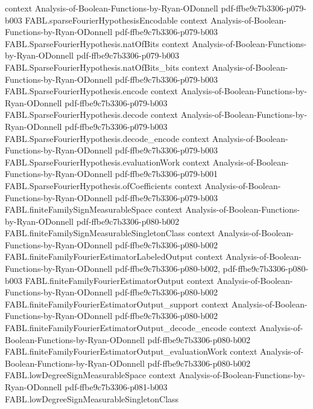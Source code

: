 \begin{theorem}
  {context}
  {Analysis-of-Boolean-Functions-by-Ryan-ODonnell}
  {pdf-ffbe9c7b3306-p079-b003}
\proofstep
  {FABL.sparseFourierHypothesisEncodable}
  {context}
  {Analysis-of-Boolean-Functions-by-Ryan-ODonnell}
  {pdf-ffbe9c7b3306-p079-b003}
\proofstep
  {FABL.SparseFourierHypothesis.natOfBits}
  {context}
  {Analysis-of-Boolean-Functions-by-Ryan-ODonnell}
  {pdf-ffbe9c7b3306-p079-b003}
\proofstep
  {FABL.SparseFourierHypothesis.natOfBits_bits}
  {context}
  {Analysis-of-Boolean-Functions-by-Ryan-ODonnell}
  {pdf-ffbe9c7b3306-p079-b003}
\proofstep
  {FABL.SparseFourierHypothesis.encode}
  {context}
  {Analysis-of-Boolean-Functions-by-Ryan-ODonnell}
  {pdf-ffbe9c7b3306-p079-b003}
\proofstep
  {FABL.SparseFourierHypothesis.decode}
  {context}
  {Analysis-of-Boolean-Functions-by-Ryan-ODonnell}
  {pdf-ffbe9c7b3306-p079-b003}
\proofstep
  {FABL.SparseFourierHypothesis.decode_encode}
  {context}
  {Analysis-of-Boolean-Functions-by-Ryan-ODonnell}
  {pdf-ffbe9c7b3306-p079-b003}
\proofstep
  {FABL.SparseFourierHypothesis.evaluationWork}
  {context}
  {Analysis-of-Boolean-Functions-by-Ryan-ODonnell}
  {pdf-ffbe9c7b3306-p079-b001}
\proofstep
  {FABL.SparseFourierHypothesis.ofCoefficients}
  {context}
  {Analysis-of-Boolean-Functions-by-Ryan-ODonnell}
  {pdf-ffbe9c7b3306-p079-b003}
\proofstep
  {FABL.finiteFamilySignMeasurableSpace}
  {context}
  {Analysis-of-Boolean-Functions-by-Ryan-ODonnell}
  {pdf-ffbe9c7b3306-p080-b002}
\proofstep
  {FABL.finiteFamilySignMeasurableSingletonClass}
  {context}
  {Analysis-of-Boolean-Functions-by-Ryan-ODonnell}
  {pdf-ffbe9c7b3306-p080-b002}
\proofstep
  {FABL.finiteFamilyFourierEstimatorLabeledOutput}
  {context}
  {Analysis-of-Boolean-Functions-by-Ryan-ODonnell}
  {pdf-ffbe9c7b3306-p080-b002,
    pdf-ffbe9c7b3306-p080-b003}
\proofstep
  {FABL.finiteFamilyFourierEstimatorOutput}
  {context}
  {Analysis-of-Boolean-Functions-by-Ryan-ODonnell}
  {pdf-ffbe9c7b3306-p080-b002}
\proofstep
  {FABL.finiteFamilyFourierEstimatorOutput_support}
  {context}
  {Analysis-of-Boolean-Functions-by-Ryan-ODonnell}
  {pdf-ffbe9c7b3306-p080-b002}
\proofstep
  {FABL.finiteFamilyFourierEstimatorOutput_decode_encode}
  {context}
  {Analysis-of-Boolean-Functions-by-Ryan-ODonnell}
  {pdf-ffbe9c7b3306-p080-b002}
\proofstep
  {FABL.finiteFamilyFourierEstimatorOutput_evaluationWork}
  {context}
  {Analysis-of-Boolean-Functions-by-Ryan-ODonnell}
  {pdf-ffbe9c7b3306-p080-b002}
\proofstep
  {FABL.lowDegreeSignMeasurableSpace}
  {context}
  {Analysis-of-Boolean-Functions-by-Ryan-ODonnell}
  {pdf-ffbe9c7b3306-p081-b003}
\proofstep
  {FABL.lowDegreeSignMeasurableSingletonClass}

\end{theorem}
